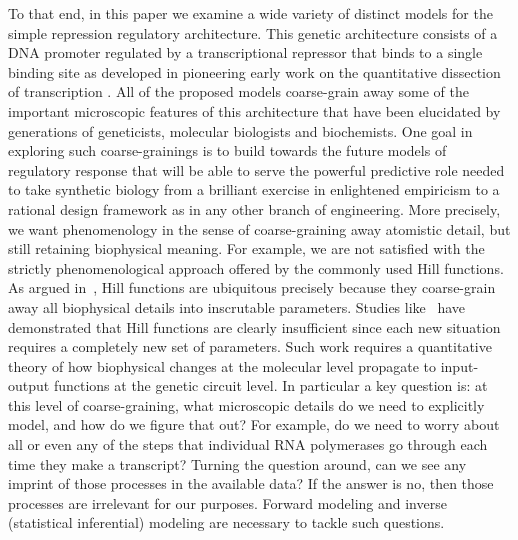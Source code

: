 To that end, in this paper we examine a wide variety of distinct models for the
simple repression regulatory architecture. This genetic architecture consists of
a DNA promoter regulated by a transcriptional repressor that binds to a single
binding site as developed in pioneering early work on the quantitative
dissection of transcription \cite{Oehler1994, Oehler1990}. All of the proposed
models coarse-grain away some of the important microscopic features of
this architecture that have been elucidated by generations of geneticists,
molecular biologists and biochemists.
One goal in exploring such coarse-grainings is to build towards the
future models of regulatory response that will be
able to serve the powerful predictive role needed to take synthetic biology from
a brilliant exercise in enlightened empiricism to a rational design framework as
in any other branch of engineering. More precisely, we want phenomenology in the
sense of coarse-graining away atomistic detail, but still retaining biophysical
meaning. For example, we are not satisfied with the strictly phenomenological
approach offered by the commonly used Hill functions. As argued
in~\cite{Frank2013}, Hill functions are ubiquitous precisely because they
coarse-grain away all biophysical details into inscrutable parameters. Studies
like~\cite{Razo-Mejia2018} have demonstrated that Hill functions are clearly
insufficient since each new situation requires a completely new set of
parameters. Such work requires a quantitative theory of how biophysical changes
at the molecular level propagate to input-output functions at the genetic
circuit level. In particular a key question
is: at this level of coarse-graining, what microscopic details do we need to
explicitly model, and how do we figure that out? For example, do we need to
worry about all or even any of the steps that individual RNA polymerases go
through each time they make a transcript? Turning the question around, can we
see any imprint of those processes in the available data? If the answer is no,
then those processes are irrelevant for our purposes. Forward modeling and
inverse (statistical inferential) modeling are necessary to tackle such
questions.


